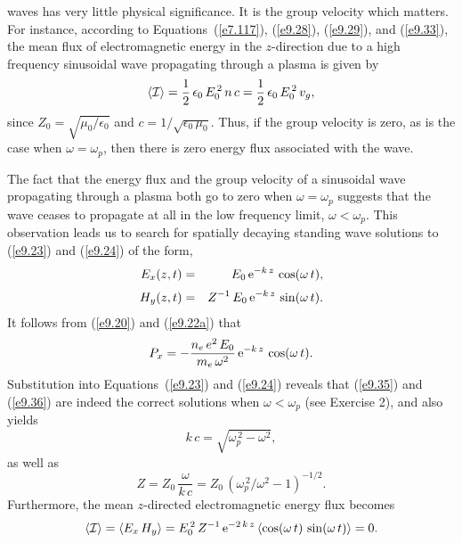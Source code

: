 waves has very little physical significance. It is the group velocity which matters. For instance, according to Equations~(\ref{e7.117}), (\ref{e9.28}), (\ref{e9.29}), and (\ref{e9.33}), the mean flux of electromagnetic energy in
the $z$-direction due to a high frequency sinusoidal wave propagating through a plasma is given by
\begin{equation}
\langle {\cal I}\rangle = \frac{1}{2}\,\epsilon_0\,E_0^{\,2}\,n\,c = \frac{1}{2}\,\epsilon_0\,E_0^{\,2}\,v_g,
\end{equation}
since $Z_0=\sqrt{\mu_0/\epsilon_0}$ and $c=1/\sqrt{\epsilon_0\,\mu_0}$. 
Thus, if the group velocity is zero, as is the case when $\omega = \omega_p$, then there is zero energy flux associated with the wave.

The fact that the energy flux and the group velocity of a sinusoidal wave propagating through a plasma both go to zero when $\omega=\omega_p$
suggests that the wave ceases to propagate at all in the low frequency limit, $\omega<\omega_p$. This observation leads us to search for
spatially decaying standing wave solutions to (\ref{e9.23}) and (\ref{e9.24}) of the form,
\begin{eqnarray}\label{e9.35}
E_x(z,t) &=& E_0\,{\rm e}^{-k\,z}\,\cos(\omega\,t),\\[0.5ex]
H_y(z,t)&=&Z^{-1}\,E_0\,{\rm e}^{-k\,z}\,\sin(\omega\,t).\label{e9.36}
\end{eqnarray}
It follows from (\ref{e9.20}) and (\ref{e9.22a}) that
\begin{equation}\label{e9.37}
P_x = - \frac{n_e\,e^2\,E_0}{m_e\,\omega^2}\,{\rm e}^{-k\,z}\,\cos(\omega\,t).
\end{equation}
Substitution into Equations~(\ref{e9.23}) and (\ref{e9.24})  reveals that
(\ref{e9.35}) and (\ref{e9.36}) are indeed the correct solutions when $\omega<\omega_p$ (see Exercise 2), and also yields
\begin{equation}\label{e9.38}
k\,c=\sqrt{\omega_p^{\,2}-\omega^2},
\end{equation}
as well as
\begin{equation}\label{e9.39}
Z = Z_0\,\frac{\omega}{k\,c}= Z_0\,(\omega_p^{\,2}/\omega^2-1)^{-1/2}.
\end{equation}
Furthermore, the mean $z$-directed electromagnetic energy flux becomes
\begin{equation}
\langle {\cal I}\rangle =\langle E_x\,H_y\rangle = E_0^{\,2}\,Z^{-1}\,{\rm e}^{-2\,k\,z}\,\langle\cos(\omega\,t)\,\sin(\omega\,t)\rangle=0.
\end{equation}
